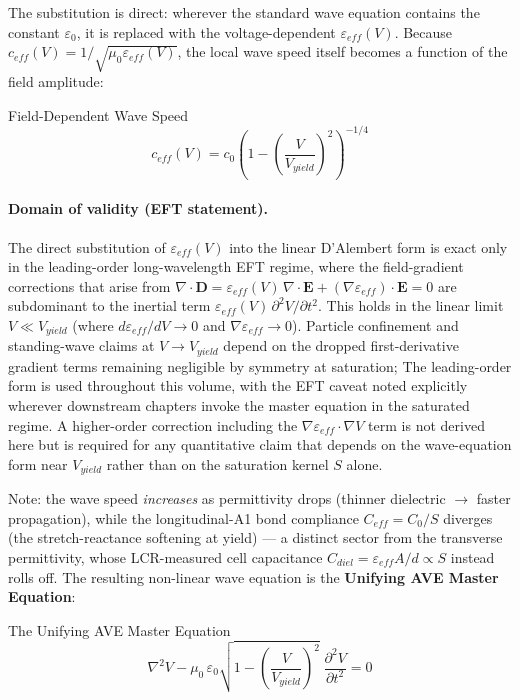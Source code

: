 The substitution is direct: wherever the standard wave equation contains the constant $\varepsilon_0$, it is replaced with the voltage-dependent $\varepsilon_{eff}(V)$. Because $c_{eff}(V) = 1/\sqrt{\mu_0 \varepsilon_{eff}(V)}$, the local wave speed itself becomes a function of the field amplitude:
\begin{resultbox}{Field-Dependent Wave Speed}
\begin{equation}
c_{eff}(V) = c_0 \left(1 - \left(\frac{V}{V_{yield}}\right)^2\right)^{-1/4}
\end{equation}
\end{resultbox}

\paragraph{Domain of validity (EFT statement).} The direct substitution of $\varepsilon_{eff}(V)$ into the linear D'Alembert form is exact only in the leading-order long-wavelength EFT regime, where the field-gradient corrections that arise from $\nabla \cdot \mathbf{D} = \varepsilon_{eff}(V)\,\nabla \cdot \mathbf{E} + (\nabla \varepsilon_{eff})\cdot \mathbf{E} = 0$ are subdominant to the inertial term $\varepsilon_{eff}(V)\,\partial^2 V/\partial t^2$. This holds in the linear limit $V \ll V_{yield}$ (where $d\varepsilon_{eff}/dV \to 0$ and $\nabla \varepsilon_{eff} \to 0$). Particle confinement and standing-wave claims at $V \to V_{yield}$ depend on the dropped first-derivative gradient terms remaining negligible by symmetry at saturation; The leading-order form is used throughout this volume, with the EFT caveat noted explicitly wherever downstream chapters invoke the master equation in the saturated regime. A higher-order correction including the $\nabla \varepsilon_{eff} \cdot \nabla V$ term is not derived here but is required for any quantitative claim that depends on the wave-equation form near $V_{yield}$ rather than on the saturation kernel $S$ alone.

Note: the wave speed \emph{increases} as permittivity drops (thinner dielectric $\to$ faster propagation), while the longitudinal-A1 bond compliance $C_{eff} = C_0/S$ diverges (the stretch-reactance softening at yield) --- a distinct sector from the transverse permittivity, whose LCR-measured cell capacitance $C_{diel} = \varepsilon_{eff} A/d \propto S$ instead rolls off. The resulting non-linear wave equation is the \textbf{Unifying AVE Master Equation}:
\begin{resultbox}{The Unifying AVE Master Equation}
\begin{equation}
\label{eq:master_wave}
\nabla^2 V - \mu_0 \, \varepsilon_0 \sqrt{1 - \left(\frac{V}{V_{yield}}\right)^2}
\;\frac{\partial^2 V}{\partial t^2} = 0
\end{equation}
\end{resultbox}

